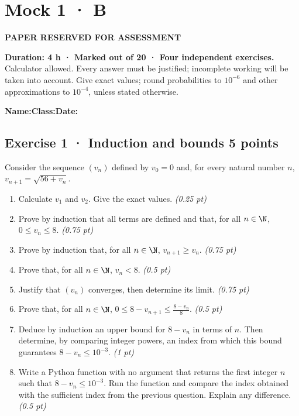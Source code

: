 \fi

\fi

\ifprof

\clearpage{}\label{sujet:5-4}

\section*{Mock 1 · B}

{\sffamily\bfseries\color{amber}PAPER RESERVED FOR ASSESSMENT\par}

\textbf{Duration: 4 h · Marked out of 20 · Four independent exercises.}\\Calculator allowed. Every answer must be justified; incomplete working will be taken into account. Give exact values; round probabilities to $10^{-6}$ and other approximations to $10^{-4}$, unless stated otherwise.

\smallskip\textbf{Name:}\enspace\dotfill\quad\textbf{Class:}\enspace\dotfill\quad\textbf{Date:}\enspace\dotfill

\subsection*{Exercise 1 · Induction and bounds \hfill 5 points}Consider the sequence $(v_n)$ defined by $v_0=0$ and, for every natural number $n$, $v_{n+1}=\sqrt{56+v_n}$.

\begin{enumerate}

\item Calculate $v_1$ and $v_2$. Give the exact values. \hfill\textit{(0.25 pt)}

\item Prove by induction that all terms are defined and that, for all $n\in\N$, $0\le v_n\le8$. \hfill\textit{(0.75 pt)}

\item Prove by induction that, for all $n\in\N$, $v_{n+1}\ge v_n$. \hfill\textit{(0.75 pt)}

\item Prove that, for all $n\in\N$, $v_n<8$. \hfill\textit{(0.5 pt)}

\item Justify that $(v_n)$ converges, then determine its limit. \hfill\textit{(0.75 pt)}

\item Prove that, for all $n\in\N$, $0\le 8-v_{n+1}\le\frac{8-v_n}{8}$. \hfill\textit{(0.5 pt)}

\item Deduce by induction an upper bound for $8-v_n$ in terms of $n$. Then determine, by comparing integer powers, an index from which this bound guarantees $8-v_n\le10^{-3}$. \hfill\textit{(1 pt)}

\item Write a Python function with no argument that returns the first integer $n$ such that $8-v_n\le10^{-3}$. Run the function and compare the index obtained with the sufficient index from the previous question. Explain any difference. \hfill\textit{(0.5 pt)}

\end{enumerate}


